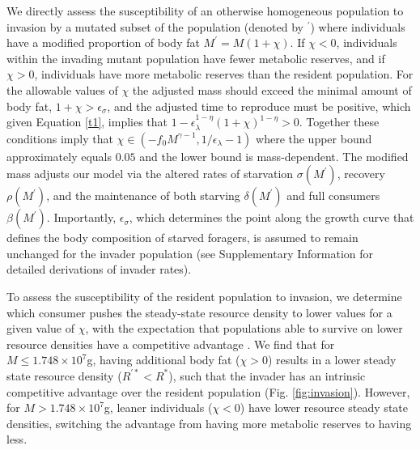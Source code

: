 \documentclass[twocolumn,preprintnumbers,amsmath,amssymb,superscriptaddress]{revtex4}
\begin{document}
\begin{bibunit}[unsrt]
We directly assess the susceptibility of an otherwise homogeneous population to invasion by a mutated subset of the population (denoted by $^\prime$) where individuals have a modified proportion of body fat $M^\prime=M(1+\chi)$.
If $\chi < 0$, individuals within the invading mutant population have fewer metabolic reserves, and if $\chi>0$, individuals have more metabolic reserves than the resident population.
For the allowable values of $\chi$ the adjusted mass should exceed the minimal amount of body fat, $1+\chi>\epsilon_{\sigma}$, and the adjusted time to reproduce must be positive, which given Equation \ref{t1}, implies that $1-\epsilon_{\lambda}^{1-\eta}\left(1+\chi\right)^{1-\eta}>0$.
Together these conditions imply that  $\chi\in(-f_0M^{\gamma-1},1/\epsilon_{\lambda}-1)$ where the upper bound approximately equals $0.05$ and the lower bound is mass-dependent.
The modified mass adjusts our model via the altered rates of starvation $\sigma(M^\prime)$, recovery $\rho(M^\prime)$, and the maintenance of both starving $\delta(M^\prime)$ and full consumers $\beta(M^\prime)$.
Importantly, $\epsilon_\sigma$, which determines the point along the growth curve that defines the body composition of starved foragers, is assumed to remain unchanged for the invader population (see Supplementary Information for detailed derivations of invader rates).

To assess the susceptibility of the resident population to invasion, we determine which consumer pushes the steady-state resource density to lower values for a given value of $\chi$, with the expectation that populations able to survive on lower resource densities have a competitive advantage \citep{tilman1981}.
We find that for $M\leq 1.748\times10^7$g, having additional body fat ($\chi > 0$) results in a lower steady state resource density ($R^{\prime *}<R^*$), such that the invader has an intrinsic competitive advantage over the resident population (Fig. \ref{fig:invasion}).
However, for $M> 1.748\times10^7$g, leaner individuals ($\chi < 0$) have lower resource steady state densities, switching the advantage from having more metabolic reserves to having less.





\end{bibunit}
\end{document}
